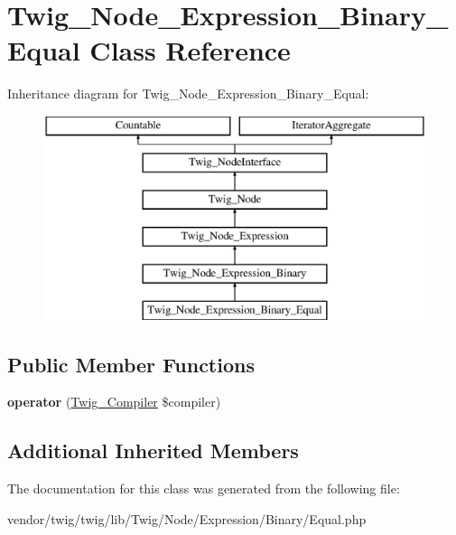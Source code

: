 \hypertarget{classTwig__Node__Expression__Binary__Equal}{}\section{Twig\+\_\+\+Node\+\_\+\+Expression\+\_\+\+Binary\+\_\+\+Equal Class Reference}
\label{classTwig__Node__Expression__Binary__Equal}
Inheritance diagram for Twig\+\_\+\+Node\+\_\+\+Expression\+\_\+\+Binary\+\_\+\+Equal\+:\begin{figure}[H]
\begin{center}
\leavevmode
\includegraphics[height=6.000000cm]{classTwig__Node__Expression__Binary__Equal}
\end{center}
\end{figure}
\subsection*{Public Member Functions}
\begin{DoxyCompactItemize}
\item 
{\bfseries operator} (\hyperlink{classTwig__Compiler}{Twig\+\_\+\+Compiler} \$compiler)\hypertarget{classTwig__Node__Expression__Binary__Equal_a51b0f7cebecc71947c744791eed50e2b}{}\label{classTwig__Node__Expression__Binary__Equal_a51b0f7cebecc71947c744791eed50e2b}

\end{DoxyCompactItemize}
\subsection*{Additional Inherited Members}


The documentation for this class was generated from the following file\+:\begin{DoxyCompactItemize}
\item 
vendor/twig/twig/lib/\+Twig/\+Node/\+Expression/\+Binary/Equal.\+php\end{DoxyCompactItemize}
